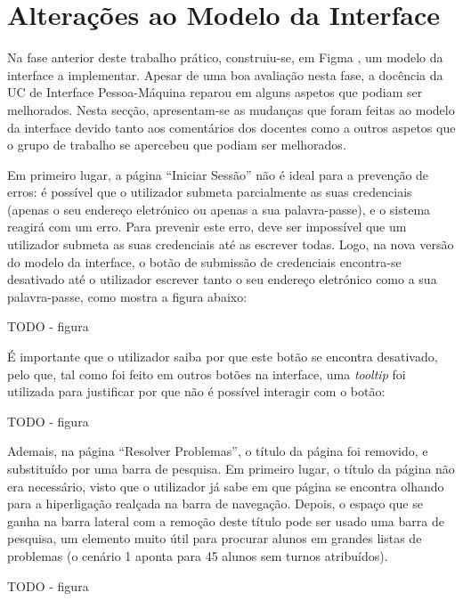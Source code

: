 \documentclass[12pt, a4paper]{article}
\begin{document}
\begin{abstract}
    \noindent
\end{abstract}

\section{Alterações ao Modelo da Interface}

Na fase anterior deste trabalho prático, construiu-se, em Figma \cite{figma}, um modelo da interface
a implementar. Apesar de uma boa avaliação nesta fase, a docência da UC de Interface Pessoa-Máquina
reparou em alguns aspetos que podiam ser melhorados. Nesta secção, apresentam-se as mudanças que
foram feitas ao modelo da interface devido tanto aos comentários dos docentes como a outros aspetos
que o grupo de trabalho se apercebeu que podiam ser melhorados.

Em primeiro lugar, a página ``Iniciar Sessão'' não é ideal para a prevenção de erros: é possível que
o utilizador submeta parcialmente as suas credenciais (apenas o seu endereço eletrónico ou apenas a
sua palavra-passe), e o sistema reagirá com um erro. Para prevenir este erro, deve ser impossível
que um utilizador submeta as suas credenciais até as escrever todas. Logo, na nova versão do modelo
da interface, o botão de submissão de credenciais encontra-se desativado até o utilizador escrever
tanto o seu endereço eletrónico como a sua palavra-passe, como mostra a figura abaixo:

{\color{red} TODO - figura}

É importante que o utilizador saiba por que este botão se encontra desativado, pelo que, tal como
foi feito em outros botões na interface, uma \emph{tooltip} foi utilizada para justificar por que
não é possível interagir com o botão:

{\color{red} TODO - figura}

Ademais, na página ``Resolver Problemas'', o título da página foi removido, e substituído por uma
barra de pesquisa. Em primeiro lugar, o título da página não era necessário, visto que o utilizador
já sabe em que página se encontra olhando para a hiperligação realçada na barra de navegação.
Depois, o espaço que se ganha na barra lateral com a remoção deste título pode ser usado uma barra
de pesquisa, um elemento muito útil para procurar alunos em grandes listas de problemas (o cenário 1
aponta para 45 alunos sem turnos atribuídos).

{\color{red} TODO - figura}
\end{document}
